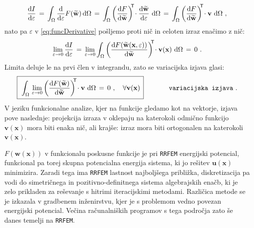 \begin{equation}
	\frac{\mathrm{d} I}{\mathrm{d} \varepsilon} \, =
	\, \int_{\Omega} \frac{\mathrm{d}}{\mathrm{d} \varepsilon} F(\widetilde{\mathbf{w}}) \, \mathrm{d} \Omega \, =
	\, \int_{\Omega} \left(\frac{\mathrm{d} F}{\mathrm{d} \widetilde{\mathbf{w}}}\right)^\mathsf{\mkern-7mu T} \! \cdot \frac{\mathrm{d} \widetilde{\mathbf{w}}}{\mathrm{d} \varepsilon} \ \mathrm{d} \Omega \, =
	\, \int_{\Omega} \left(\frac{\mathrm{d} F}{\mathrm{d} \widetilde{\mathbf{w}}}\right)^\mathsf{\mkern-7mu T} \! \cdot \mathbf{v} \ \mathrm{d} \Omega \ ,
\label{eq:funcDerivative}
\end{equation}
nato pa $\varepsilon$ v \eqref{eq:funcDerivative} pošljemo proti nič in celoten izraz enačimo z nič:
\begin{equation}
	\lim_{\varepsilon \rightarrow 0} \frac{\mathrm{d} I}{\mathrm{d} \varepsilon} \, = \, \lim_{\varepsilon \rightarrow 0} \int_{\Omega} \left(\frac{\mathrm{d} F(\widetilde{\mathbf{w}}(\mathbf{x}, \varepsilon))}{\mathrm{d} \widetilde{\mathbf{w}}}\right)^\mathsf{\mkern-7mu T} \! \cdot \mathbf{v(\mathbf{x})} \ \mathrm{d} \Omega \, = \, 0 \ .
\end{equation}
Limita deluje le na prvi člen v integrandu, zato se variacijska izjava glasi:
\begin{equation}
	\boxed{\, \vphantom{\bigg)^2_3}
		\int_{\Omega} \, \lim_{\varepsilon \rightarrow 0} \left(\frac{\mathrm{d} F(\widetilde{\mathbf{w}})}{\mathrm{d} \widetilde{\mathbf{w}}} \right)^\mathsf{\mkern-7mu T} \! \cdot \mathbf{v} \ \mathrm{d} \Omega \, = \, 0 \ , \quad \forall \mathbf{v(\mathbf{x})}\,
	}
	\hspace{1.3cm} \texttt{variacijska izjava} \ .
	\label{eq:variationalStatement}
\end{equation}
V jeziku funkcionalne analize, kjer na funkcije gledamo kot na vektorje, izjava pove naslednje: projekcija izraza v oklepaju na katerokoli odmično funkcijo $\mathbf{v(x)}$ mora biti enaka nič, ali krajše: izraz mora biti ortogonalen na katerokoli $\mathbf{v(x)}$.

$F\left(\mathbf{w}(\mathbf{x})\right)$ v funkcionalu poskusne funkcije je pri \texttt{RRFEM} energijski potencial, funkcional pa torej skupna potencialna energija sistema, ki jo rešitev $\mathbf{u}(\mathbf{x})$ minimizira. Zaradi tega ima \texttt{RRFEM} last\-nost najboljšega približka, diskretizacija pa vodi do simetričnega in pozitivno-definitnega sistema algebrajskih enačb, ki je zelo prikladen za reševanje s hitrimi iteracijskimi metodami. Različica metode se je izkazala v gradbenem inženirstvu, kjer je s problemom vedno povezan energijski potencial. Večina računalniških programov s tega področja zato še danes temelji na \texttt{RRFEM}.

